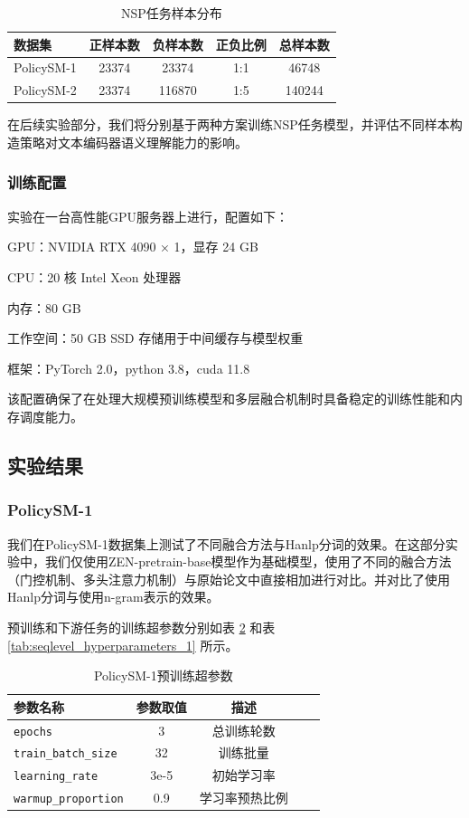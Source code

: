 \documentclass[12pt, a4paper]{ctexart}
\begin{document}
\begin{table}[H]
    \centering
    \begin{tabular}{lcccc}
        \toprule
        数据集 & 正样本数 & 负样本数 & 正负比例 & 总样本数 \\
        \midrule
        PolicySM-1 & 23374 & 23374 & 1:1 & 46748 \\
        PolicySM-2 & 23374 & 116870 & 1:5 & 140244 \\
        \bottomrule
    \end{tabular}
    \caption{NSP任务样本分布}
    \label{tab:nsp_samples}
\end{table}

在后续实验部分，我们将分别基于两种方案训练NSP任务模型，并评估不同样本构造策略对文本编码器语义理解能力的影响。

\subsubsection{训练配置}
实验在一台高性能GPU服务器上进行，配置如下：

GPU：NVIDIA RTX 4090 × 1，显存 24 GB

CPU：20 核 Intel Xeon 处理器

内存：80 GB

工作空间：50 GB SSD 存储用于中间缓存与模型权重

框架：PyTorch 2.0，python 3.8，cuda 11.8

该配置确保了在处理大规模预训练模型和多层融合机制时具备稳定的训练性能和内存调度能力。

\subsection{实验结果}
\subsubsection{PolicySM-1}
我们在PolicySM-1数据集上测试了不同融合方法与Hanlp分词的效果。在这部分实验中，我们仅使用ZEN-pretrain-base模型作为基础模型，使用了不同的融合方法（门控机制、多头注意力机制）与原始论文中直接相加进行对比。并对比了使用Hanlp分词与使用n-gram表示的效果。

预训练和下游任务的训练超参数分别如表 \ref{tab:pretrain_hyperparameters_1} 和表 \ref{tab:seqlevel_hyperparameters_1} 所示。


\begin{table}[H]
    \centering
    \begin{tabular}{lcccc}
        \toprule
        \textbf{参数名称} & \textbf{参数取值} & \textbf{描述} \\
        \midrule
        \texttt{epochs} & 3 & 总训练轮数 \\ 
        \texttt{train\_batch\_size} & 32 & 训练批量 \\
        \texttt{learning\_rate} & 3e-5 & 初始学习率 \\ 
        \texttt{warmup\_proportion} & 0.9 & 学习率预热比例 \\ 
        \bottomrule
    \end{tabular}
    \caption{PolicySM-1预训练超参数}
    \label{tab:pretrain_hyperparameters_1}
\end{table}
\end{document}
